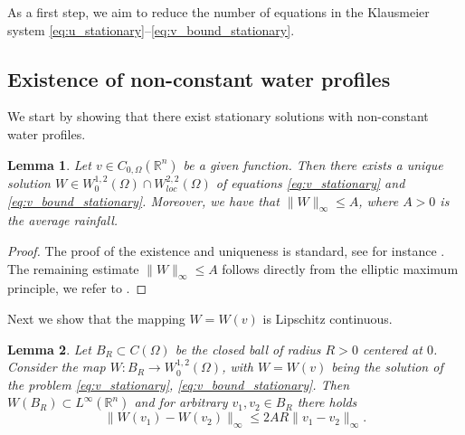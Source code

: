 \documentclass[preprint,12pt]{elsarticle}
\theoremstyle{plain}
\newtheorem{lem}{Lemma}[section]
\theoremstyle{definition}
\theoremstyle{remark}
\begin{document}
As a first step, we aim to reduce the number of equations in the Klausmeier system \eqref{eq:u_stationary}--\eqref{eq:v_bound_stationary}. 

\subsection{Existence of non-constant water profiles}

We start by showing that there exist stationary solutions with non-constant water profiles. 
 
\begin{lem}
    \label{lem:existence_of_inhomogeneous_elliptic_v}
    Let $v \in C_{0, \Omega}(\mathbb{R}^n)$ be a given function. Then there exists a unique solution $W \in W^{1,2}_0(\Omega) \cap W^{2,2}_{loc}(\Omega)$ of equations \eqref{eq:v_stationary} and \eqref{eq:v_bound_stationary}. Moreover, we have that $\|W \|_\infty \leq A$, where $A >0$ is the average rainfall. 
\end{lem}
\begin{proof}
    The proof of the existence and uniqueness is standard, see for instance \cite[Theorem 8.9]{gilbarg2001elliptic}. The remaining estimate $\|W\|_\infty \leq A$ follows directly from the elliptic maximum principle, we refer to \cite[Chapter 3]{gilbarg2001elliptic}.
\end{proof}

Next we show that the mapping $W = W(v)$ is Lipschitz continuous.
\begin{lem}
    \label{lem:stationary_v_lipschitz_constant}
    Let $B_R \subset C(\Omega)$ be the closed ball of radius $R > 0$ centered at $0$. 
    Consider the map $W : B_R \rightarrow W^{1,2}_0(\Omega)$, with $W=W(v)$ being the solution of the problem \eqref{eq:v_stationary}, \eqref{eq:v_bound_stationary}. Then $W (B_R) \subset L^\infty(\mathbb{R}^n)$ and for arbitrary $v_1, v_2 \in B_R$ there holds
    \begin{equation}
        \label{eq:W_Lipschitz_continuity}
        \|W(v_1) - W(v_2)\|_\infty \leq 2 A R \|v_1 - v_2\|_\infty.
    \end{equation}
\end{lem}
\end{document}
